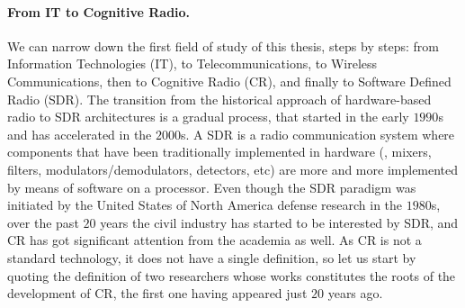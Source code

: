 \paragraph{From IT to Cognitive Radio.}
%
We can narrow down the first field of study of this thesis, steps by steps:
from Information Technologies (IT), to Telecommunications, to Wireless Communications, then to Cognitive Radio (CR),
and finally to Software Defined Radio (SDR).
%
The transition from the historical approach of hardware-based radio to SDR architectures is a gradual process, that started in the early $1990$s and has accelerated in the $2000$s.
A SDR is a radio communication system where components that have been traditionally implemented in hardware (\eg, mixers, filters, modulators/demodulators, detectors, etc) are more and more implemented by means of software on a processor.
Even though the SDR paradigm was initiated by the United States of North America defense research in the $1980$s, over the past $20$ years the civil industry has started to be interested by SDR, and CR has got significant attention from the academia as well.
%
As CR is not a standard technology, it does not have a single definition, so let us start by quoting the definition of two researchers whose works constitutes the roots of the development of CR, the first one having appeared just $20$ years ago.
%
